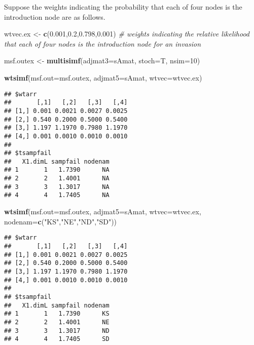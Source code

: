 \documentclass[]{article}
\newenvironment{Shaded}{\begin{snugshade}}{\end{snugshade}}
\newcommand{\KeywordTok}[1]{\textcolor[rgb]{0.13,0.29,0.53}{\textbf{#1}}}
\newcommand{\DataTypeTok}[1]{\textcolor[rgb]{0.13,0.29,0.53}{#1}}
\newcommand{\DecValTok}[1]{\textcolor[rgb]{0.00,0.00,0.81}{#1}}
\newcommand{\FloatTok}[1]{\textcolor[rgb]{0.00,0.00,0.81}{#1}}
\newcommand{\StringTok}[1]{\textcolor[rgb]{0.31,0.60,0.02}{#1}}
\newcommand{\CommentTok}[1]{\textcolor[rgb]{0.56,0.35,0.01}{\textit{#1}}}
\newcommand{\NormalTok}[1]{#1}
\begin{document}
Suppose the weights indicating the probability that each of four nodes
is the introduction node are as follows.

\begin{Shaded}
\begin{Highlighting}[]
\NormalTok{wtvec.ex <-}\StringTok{ }\KeywordTok{c}\NormalTok{(}\FloatTok{0.001}\NormalTok{,}\FloatTok{0.2}\NormalTok{,}\FloatTok{0.798}\NormalTok{,}\FloatTok{0.001}\NormalTok{) }\CommentTok{# weights indicating the relative likelihood that each of four nodes is the introduction node for an invasion }

\NormalTok{msf.outex <-}\StringTok{ }\KeywordTok{multisimf}\NormalTok{(}\DataTypeTok{adjmat3=}\NormalTok{sAmat, }\DataTypeTok{stoch=}\NormalTok{T, }\DataTypeTok{nsim=}\DecValTok{10}\NormalTok{)}

\KeywordTok{wtsimf}\NormalTok{(}\DataTypeTok{msf.out=}\NormalTok{msf.outex, }\DataTypeTok{adjmat5=}\NormalTok{sAmat, }\DataTypeTok{wtvec=}\NormalTok{wtvec.ex)}
\end{Highlighting}
\end{Shaded}

\begin{verbatim}
## $wtarr
##       [,1]   [,2]   [,3]   [,4]
## [1,] 0.001 0.0021 0.0027 0.0025
## [2,] 0.540 0.2000 0.5000 0.5400
## [3,] 1.197 1.1970 0.7980 1.1970
## [4,] 0.001 0.0010 0.0010 0.0010
## 
## $tsampfail
##   X1.dimL sampfail nodenam
## 1       1   1.7390      NA
## 2       2   1.4001      NA
## 3       3   1.3017      NA
## 4       4   1.7405      NA
\end{verbatim}

\begin{Shaded}
\begin{Highlighting}[]
\KeywordTok{wtsimf}\NormalTok{(}\DataTypeTok{msf.out=}\NormalTok{msf.outex, }\DataTypeTok{adjmat5=}\NormalTok{sAmat, }\DataTypeTok{wtvec=}\NormalTok{wtvec.ex, }\DataTypeTok{nodenam=}\KeywordTok{c}\NormalTok{(}\StringTok{"KS"}\NormalTok{,}\StringTok{"NE"}\NormalTok{,}\StringTok{"ND"}\NormalTok{,}\StringTok{"SD"}\NormalTok{))}
\end{Highlighting}
\end{Shaded}

\begin{verbatim}
## $wtarr
##       [,1]   [,2]   [,3]   [,4]
## [1,] 0.001 0.0021 0.0027 0.0025
## [2,] 0.540 0.2000 0.5000 0.5400
## [3,] 1.197 1.1970 0.7980 1.1970
## [4,] 0.001 0.0010 0.0010 0.0010
## 
## $tsampfail
##   X1.dimL sampfail nodenam
## 1       1   1.7390      KS
## 2       2   1.4001      NE
## 3       3   1.3017      ND
## 4       4   1.7405      SD
\end{verbatim}
\end{document}
